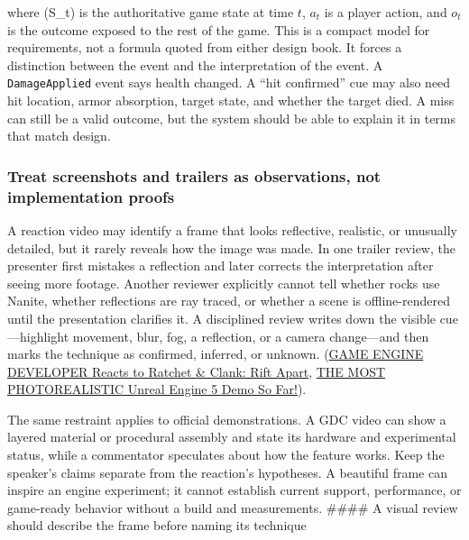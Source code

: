 where (S\_t) is the authoritative game state at time \(t\), \(a_t\) is a player action, and \(o_t\) is the outcome exposed to the rest of the game. This is a compact model for requirements, not a formula quoted from either design book. It forces a distinction between the event and the interpretation of the event. A \texttt{DamageApplied} event says health changed. A ``hit confirmed'' cue may also need hit location, armor absorption, target state, and whether the target died. A miss can still be a valid outcome, but the system should be able to explain it in terms that match design.

\subsubsection{Treat screenshots and trailers as observations, not implementation proofs}\label{05-engine-i-ch009-treat-screenshots-and-trailers-as-observations-not-implementation-proofs}

A reaction video may identify a frame that looks reflective, realistic, or unusually detailed, but it rarely reveals how the image was made. In one trailer review, the presenter first mistakes a reflection and later corrects the interpretation after seeing more footage. Another reviewer explicitly cannot tell whether rocks use Nanite, whether reflections are ray traced, or whether a scene is offline-rendered until the presentation clarifies it. A disciplined review writes down the visible cue---highlight movement, blur, fog, a reflection, or a camera change---and then marks the technique as confirmed, inferred, or unknown. (\href{https://www.youtube.com/watch?v=qCSyy5BTDuc&t=0m0s}{GAME ENGINE DEVELOPER Reacts to Ratchet \& Clank: Rift Apart}, \href{https://www.youtube.com/watch?v=jbEfCcl7gOw&t=0m0s}{THE MOST PHOTOREALISTIC Unreal Engine 5 Demo So Far!}).

The same restraint applies to official demonstrations. A GDC video can show a layered material or procedural assembly and state its hardware and experimental status, while a commentator speculates about how the feature works. Keep the speaker's claims separate from the reaction's hypotheses. A beautiful frame can inspire an engine experiment; it cannot establish current support, performance, or game-ready behavior without a build and measurements. \#\#\#\# A visual review should describe the frame before naming its technique

